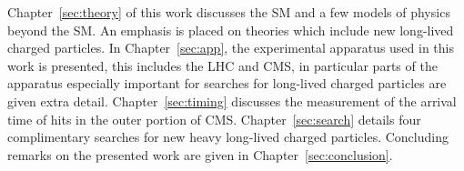 Chapter~\ref{sec:theory} of this work discusses the SM and a few models of physics beyond the SM. 
An emphasis is placed on theories which include new long-lived charged particles.
In Chapter~\ref{sec:app}, the experimental apparatus used in this work is presented, this includes the LHC and 
CMS, in particular parts of the apparatus especially important
for searches for long-lived charged particles are given extra detail.
Chapter~\ref{sec:timing} discusses the measurement of the arrival time of hits in the outer portion of CMS.
Chapter~\ref{sec:search} details four complimentary searches for new heavy long-lived charged particles.
Concluding remarks on the presented work are given in Chapter~\ref{sec:conclusion}.